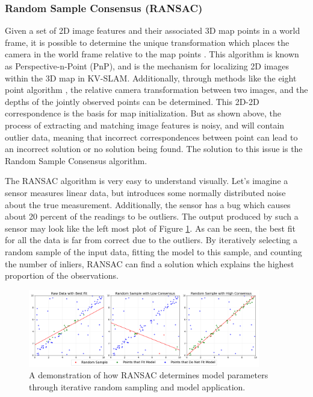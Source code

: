 \subsubsection{Random Sample Consensus (RANSAC)}

Given a set of 2D image features and their associated 3D map points in a world frame, it is possible to determine the unique transformation which places the camera in the world frame relative to the map points \cite{longuet-higginsComputerAlgorithmReconstructing1981}. This algorithm is known as Perspective-n-Point (PnP), and is the mechanism for localizing 2D images within the 3D map in KV-SLAM. Additionally, through methods like the eight point algorithm \cite{hartleyDefenseEightpointAlgorithm1997}, the relative camera transformation between two images, and the depths of the jointly observed points can be determined. This 2D-2D correspondence is the basis for map initialization. But as shown above, the process of extracting and matching image features is noisy, and will contain outlier data, meaning that incorrect correspondences between point can lead to an incorrect solution or no solution being found. The solution to this issue is the Random Sample Consensus algorithm.

The RANSAC algorithm is very easy to understand visually. Let's imagine a sensor measures linear data, but introduces some normally distributed noise about the true measurement. Additionally, the sensor has a bug which causes about 20 percent of the readings to be outliers. The output produced by such a sensor may look like the left most plot of Figure \ref{fig:ransac}. As can be seen, the best fit for all the data is far from correct due to the outliers. By iteratively selecting a random sample of the input data, fitting the model to this sample, and counting the number of inliers, RANSAC can find a solution which explains the highest proportion of the observations.

\begin{figure}[!ht]
    \centering
    \includegraphics[width=0.9\textwidth]{resources/ransac.png}
    \caption[2D RANSAC Example]{A demonstration of how RANSAC determines model parameters through iterative random sampling and model application.}
    \label{fig:ransac}
\end{figure}

